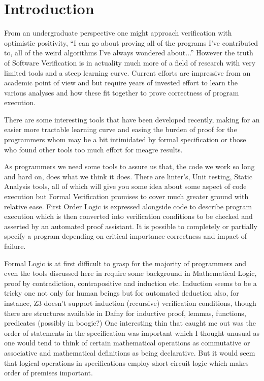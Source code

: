\documentclass[10pt]{article} %
\begin{document}
\section{Introduction}
From an undergraduate perspective one might approach verification with optimistic positivity, ``I can go about proving all of the programs I've contributed to, all of the weird algorithms I've always wondered about...'' However the truth of Software Verification is in actuality much more of a field of research with very limited tools and a steep learning curve. Current efforts are impressive from an academic point of view and but require years of invested effort to learn the various analyses and how these fit together to prove correctness of program execution.

There are some interesting tools that have been developed recently, making for an easier more tractable learning curve and easing the burden of proof for the programmers whom may be a bit intimidated by formal specification or those who found other tools too much effort for meagre results.

As programmers we need some tools to assure us that, the code we work so long and hard on, does what we think it does. There are linter's, Unit testing, Static Analysis tools, all of which will give you some idea about some aspect of code execution but Formal Verification promises to cover much greater ground with relative ease. First Order Logic is expressed alongside code to describe program execution which is then converted into verification conditions to be checked and asserted by an automated proof assistant. It is possible to completely or partially specify a program depending on critical importance correctness and impact of failure.

Formal Logic is at first difficult to grasp for the majority of programmers and even the tools discussed here in require some background in Mathematical Logic, proof by contradiction, contrapositive and induction etc. Induction seems to be a tricky one not only for human beings but for automated deduction also, for instance, Z3 doesn't support induction (recursive) verification conditions, though there are structures available in Dafny for inductive proof, lemmas, functions, predicates (possibly in boogie?) One interesting thin that caught me out was the order of statements in the specification was important which I thought unusual as one would tend to think of certain  mathematical operations as commutative or associative and mathematical definitions as being declarative. But it would seem that logical operations in specifications employ short circuit logic which makes order of premises important.
\end{document}
